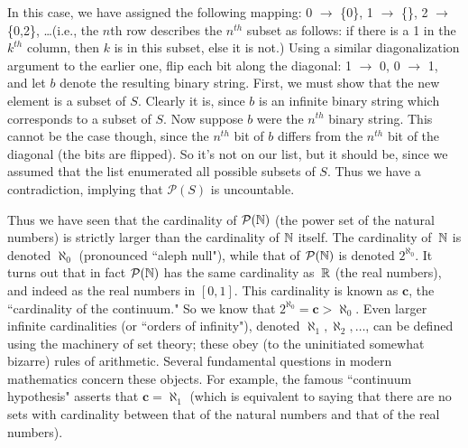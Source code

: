 \documentclass[11pt,fleqn]{article}
\begin{document}
\noindent In this case, we have assigned the following mapping: 0 $\rightarrow$
\{0\}, 1 $\rightarrow$  \{\}, 2 $\rightarrow$ \{0,2\}, \ldots (i.e., the $n$th row describes
the $n^{th}$ subset as follows: if there is a 1 in the $k^{th}$ column, then $k$ is in
this subset, else it is not.)  Using a similar diagonalization argument to the earlier
one, flip each bit along the diagonal: 1 $\rightarrow$ 0, 0 $\rightarrow$ 1, and let 
$b$ denote the resulting binary string. First, we must show
that the new element is a subset of $S$. Clearly it is, since $b$ is an infinite
binary string which corresponds to a subset of $S$. Now suppose $b$ were the $n^{th}$
binary string. This cannot be the case though, since the $n^{th}$ bit of $b$ differs from
the  $n^{th}$ bit of the diagonal (the bits are flipped). So it's not on our list, but it should be, 
since we assumed that the list enumerated all possible subsets of $S$. Thus we 
have a contradiction, implying that  $\mathcal{P}(S)$ is uncountable.

Thus we have seen that the cardinality of $\mathcal{P}(\mathbb{N})$ (the power set of the 
natural numbers) is strictly larger than the cardinality of $\mathbb{N}$ itself.  The cardinality
of~$\mathbb{N}$ is denoted $\aleph_0$ (pronounced ``aleph null"), while that of $\mathcal{P}(\mathbb{N})$
is denoted $2^{\aleph_0}$.  It turns out that in fact $\mathcal{P}(\mathbb{N})$ has the same
cardinality as~$\mathbb{R}$ (the real numbers), and indeed as the real numbers in $[0,1]$.
This cardinality is known as $\mathbf{c}$, the ``cardinality of the continuum."  So 
we know that $2^{\aleph_0}=\mathbf{c} > \aleph_0$.  Even larger infinite cardinalities 
(or ``orders of infinity"), denoted $\aleph_1,\aleph_2,\ldots$, can be defined using the 
machinery of set theory; these obey (to the uninitiated somewhat bizarre) rules of arithmetic.  
Several fundamental questions in modern mathematics concern these objects.
For example, the famous ``continuum hypothesis" asserts that $\mathbf{c}=\aleph_1$
(which is equivalent to saying that there are no sets with cardinality between that
of the natural numbers and that of the real numbers).
\end{document}
